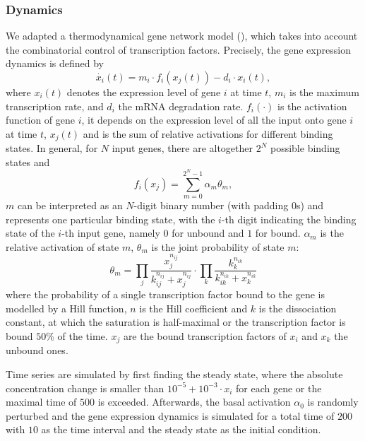 \subsubsection{Dynamics}
We adapted a thermodynamical gene network model 
(\citealp{Schilstra2002,Marbach2010,Schaffter2011}),
which takes into account the combinatorial control of transcription factors. 
Precisely, the 
gene expression dynamics is defined by 
\begin{equation}
  \dot{x_i}(t) = m_i \cdot f_i(x_j(t)) - d_i \cdot x_i(t), 
\label{eq:gnw_model}
\end{equation}
where $x_i(t)$ denotes the expression level of gene $i$ at time $t$, 
$m_i$ is the 
maximum transcription rate, and $d_i$ the mRNA degradation rate. $f_i(\cdot)$
is the activation function of gene $i$, it depends on the expression level of 
all the input onto gene $i$ at time $t$, $x_j(t)$ and is the sum of relative 
activations for
different binding states. In general, for $N$ input genes, there are altogether
$2^N$ possible binding states and
\begin{equation}
  \displaystyle f_i(x_j) = \sum_{m=0}^{2^N-1} \alpha_m \theta_m,
\end{equation}
$m$ can be interpreted as an $N$-digit binary number (with padding $0$s) 
and represents one particular binding state, with the $i$-th
digit indicating the binding state of the $i$-th input gene, namely $0$ for unbound
and $1$ for bound. $\alpha_m$ is the relative activation of state $m$,
$\theta_m$ is the joint probability of state $m$: 
\begin{equation}
  \theta_{m} = \prod_j \frac{x_j^{n_{ij}}}{k_{ij}^{n_{ij}}+x_j^{n_{ij}}}
    \cdot \prod_k \frac{k_k^{n_{ik}}}{k_{ik}^{n_{ik}}+x_k^{n_{ik}}}
\end{equation}
where the probability of a single transcription factor bound to the gene is 
modelled by a Hill function,
$n$ is the Hill coefficient and $k$ is the dissociation constant, at which the
saturation is half-maximal or the transcription factor is bound $50\%$ of the time.
$x_j$ are the bound transcription factors of $x_i$ and $x_k$ the unbound ones.

Time series are simulated by first finding the steady state, where the absolute
concentration change is smaller than $10^{-5} + 10^{-3} \cdot x_i$ for each gene
or the maximal time of $500$ is exceeded. Afterwards, the basal activation $\alpha_0$
is randomly perturbed and the gene expression dynamics is simulated for a total
time of $200$ with $10$ as the time interval and the
steady state as the initial condition.


